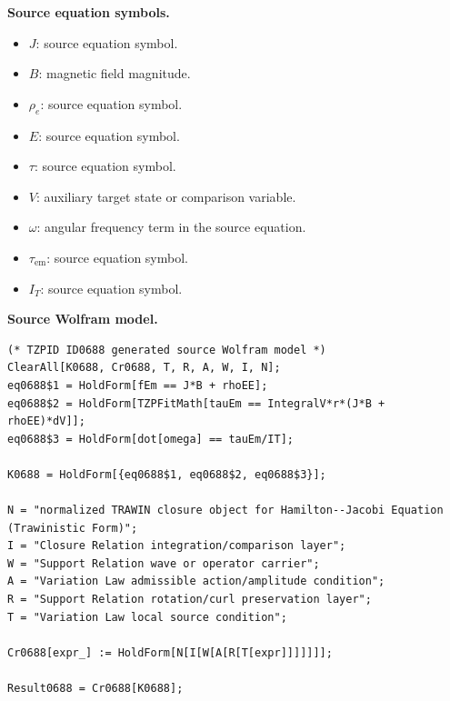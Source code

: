 \begin{minipage}[t]{0.49\linewidth}
\begingroup
\small
\raggedright
\textbf{Source equation symbols.}\par
\begin{itemize}[leftmargin=1.35em,itemsep=1pt,topsep=1pt,parsep=0pt]
    \item $J$: source equation symbol.
    \item $B$: magnetic field magnitude.
    \item $\rho_e$: source equation symbol.
    \item $E$: source equation symbol.
    \item $\tau$: source equation symbol.
    \item $V$: auxiliary target state or comparison variable.
    \item $\omega$: angular frequency term in the source equation.
    \item $\tau_{\mathrm{em}}$: source equation symbol.
    \item $I_T$: source equation symbol.
\end{itemize}
\endgroup
\end{minipage}\hfill
\begin{minipage}[t]{0.47\linewidth}
\begingroup
\scriptsize
\raggedright
\textbf{Source Wolfram model.}\par
\begin{Verbatim}[fontsize=\tiny,breaklines=true,breakanywhere=true]
(* TZPID ID0688 generated source Wolfram model *)
ClearAll[K0688, Cr0688, T, R, A, W, I, N];
eq0688$1 = HoldForm[fEm == J*B + rhoEE];
eq0688$2 = HoldForm[TZPFitMath[tauEm == IntegralV*r*(J*B + rhoEE)*dV]];
eq0688$3 = HoldForm[dot[omega] == tauEm/IT];

K0688 = HoldForm[{eq0688$1, eq0688$2, eq0688$3}];

N = "normalized TRAWIN closure object for Hamilton--Jacobi Equation (Trawinistic Form)";
I = "Closure Relation integration/comparison layer";
W = "Support Relation wave or operator carrier";
A = "Variation Law admissible action/amplitude condition";
R = "Support Relation rotation/curl preservation layer";
T = "Variation Law local source condition";

Cr0688[expr_] := HoldForm[N[I[W[A[R[T[expr]]]]]]];

Result0688 = Cr0688[K0688];
\end{Verbatim}
\endgroup
\end{minipage}

